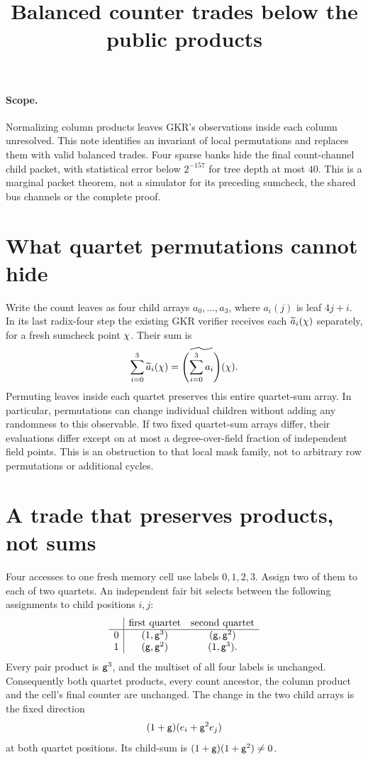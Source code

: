 \documentclass[11pt]{article}
\title{Balanced counter trades below the public products}
\author{}
\date{}
\begin{document}
\maketitle
\vspace{-2em}

\paragraph{Scope.} Normalizing column products leaves GKR's observations inside each column unresolved. This note identifies an invariant of local permutations and replaces them with valid balanced trades. Four sparse banks hide the final count-channel child packet, with statistical error below $2^{-157}$ for tree depth at most $40$. This is a marginal packet theorem, not a simulator for its preceding sumcheck, the shared bus channels or the complete proof.

\section{What quartet permutations cannot hide}

Write the count leaves as four child arrays $a_0,\ldots,a_3$, where $a_i(j)$ is leaf $4j+i$. In its last radix-four step the existing GKR verifier receives each $\widetilde{a}_i(\chi)$ separately, for a fresh sumcheck point $\chi$. Their sum is
\[
 \sum_{i=0}^3\widetilde{a}_i(\chi)
 =\widetilde{\left(\sum_{i=0}^3 a_i\right)}(\chi).
\]
Permuting leaves inside each quartet preserves this entire quartet-sum array. In particular, permutations can change individual children without adding any randomness to this observable. If two fixed quartet-sum arrays differ, their evaluations differ except on at most a degree-over-field fraction of independent field points. This is an obstruction to that local mask family, not to arbitrary row permutations or additional cycles.

\section{A trade that preserves products, not sums}

Four accesses to one fresh memory cell use labels $0,1,2,3$. Assign two of them to each of two quartets. An independent fair bit selects between the following assignments to child positions $i,j$:
\[
\begin{array}{c|cc}
 &\text{first quartet}&\text{second quartet}\\ \hline
0 &(1,\mathsf{g}^3)&(\mathsf{g},\mathsf{g}^2)\\
1 &(\mathsf{g},\mathsf{g}^2)&(1,\mathsf{g}^3).
\end{array}
\]
Every pair product is $\mathsf{g}^3$, and the multiset of all four labels is unchanged. Consequently both quartet products, every count ancestor, the column product and the cell's final counter are unchanged. The change in the two child arrays is the fixed direction
\[
 (1+\mathsf{g})(e_i+\mathsf{g}^2 e_j)
\]
at both quartet positions. Its child-sum is $(1+\mathsf{g})(1+\mathsf{g}^2)\ne0$.
\end{document}
